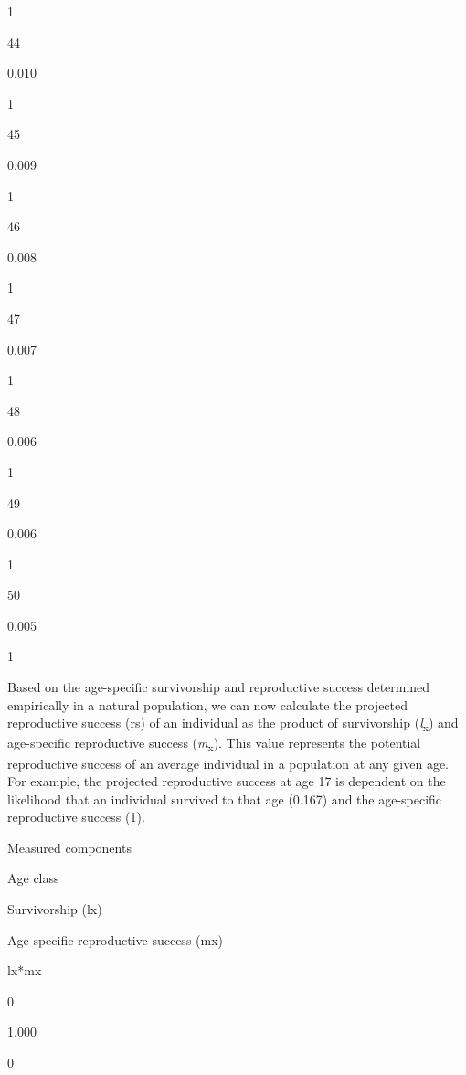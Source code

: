 \documentclass[
]{book}
\newenvironment{Shaded}{\begin{snugshade}}{\end{snugshade}}
\newcommand{\DecValTok}[1]{\textcolor[rgb]{0.00,0.00,0.81}{#1}}
\newcommand{\FunctionTok}[1]{\textcolor[rgb]{0.00,0.00,0.00}{#1}}
\newcommand{\NormalTok}[1]{#1}
\newcommand{\OtherTok}[1]{\textcolor[rgb]{0.56,0.35,0.01}{#1}}
\newcommand{\SpecialCharTok}[1]{\textcolor[rgb]{0.00,0.00,0.00}{#1}}
\begin{document}
1

44

0.010

1

45

0.009

1

46

0.008

1

47

0.007

1

48

0.006

1

49

0.006

1

50

0.005

1

Based on the age-specific survivorship and reproductive success determined empirically in a natural population, we can now calculate the projected reproductive success (rs) of an individual as the product of survivorship (\emph{l}\textsubscript{x}) and age-specific reproductive success (\emph{m}\textsubscript{x}). This value represents the potential reproductive success of an average individual in a population at any given age. For example, the projected reproductive success at age 17 is dependent on the likelihood that an individual survived to that age (0.167) and the age-specific reproductive success (1).

\begin{Shaded}
\end{Shaded}

\label{tab:unnamed-chunk-37}Measured components

Age class

Survivorship (lx)

Age-specific reproductive success (mx)

lx*mx

0

1.000

0
\end{document}
